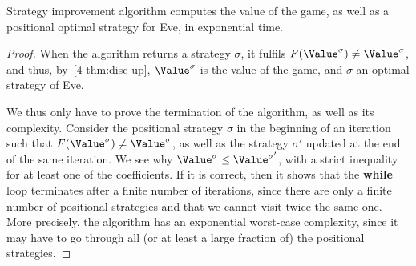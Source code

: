 \begin{theorem}\label{4-thm:DP-strategy-improvement-correctness}
  Strategy improvement algorithm computes the value of the game, as
  well as a positional optimal strategy for Eve, in exponential time. 
\end{theorem}
\begin{proof}
  When the algorithm returns a strategy $\sigma$, it fulfils
  $F(\Value^\sigma)\neq \Value^\sigma$, and thus,
  by~\cref{4-thm:disc-up}, $\Value^\sigma$ is the value of the game,
  and $\sigma$ an optimal strategy of Eve.

  We thus only have to prove the termination of the algorithm, as well
  as its complexity. Consider the positional strategy $\sigma$ in the
  beginning of an iteration such that
  $F(\Value^\sigma)\neq \Value^\sigma$, as well as the strategy
  $\sigma'$ updated at the end of the same iteration. We see why
  $\Value^\sigma\leq \Value^{\sigma'}$, with a strict inequality for
  at least one of the coefficients. If it is correct, then it shows
  that the \textbf{while} loop terminates after a finite number of
  iterations, since there are only a finite number of positional
  strategies and that we cannot visit twice the same one.  More
  precisely, the algorithm has an exponential worst-case complexity,
  since it may have to go through all (or at least a large fraction
  of) the positional strategies.


\end{proof}
